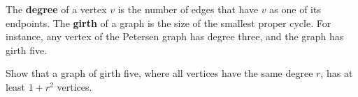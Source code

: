 \documentclass[kulak]{tplt}
\theoremstyle{definition}
\begin{document}
\begin{enumerate}
The \textbf{degree} of a vertex $v$ is the number of edges that have $v$ as one of its endpoints.
The \textbf{girth} of a graph is the size of the smallest proper cycle.
For instance, any vertex of the Petersen graph has degree three, and the graph has girth five.

Show that a graph of girth five, where all vertices have the same degree $r$, has at least $1+r^2$ vertices.

\end{enumerate}
\end{document}
